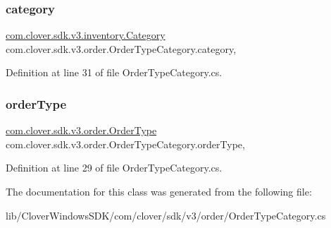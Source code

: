 \subsubsection{\texorpdfstring{category}{category}}
{\footnotesize\ttfamily \hyperlink{classcom_1_1clover_1_1sdk_1_1v3_1_1inventory_1_1_category}{com.\+clover.\+sdk.\+v3.\+inventory.\+Category} com.\+clover.\+sdk.\+v3.\+order.\+Order\+Type\+Category.\+category\hspace{0.3cm}{\ttfamily [get]}, {\ttfamily [set]}}



Definition at line 31 of file Order\+Type\+Category.\+cs.

\mbox{\label{classcom_1_1clover_1_1sdk_1_1v3_1_1order_1_1_order_type_category_a70c6c9677782416203ee5eba23ecd029}} 
\subsubsection{\texorpdfstring{order\+Type}{orderType}}
{\footnotesize\ttfamily \hyperlink{classcom_1_1clover_1_1sdk_1_1v3_1_1order_1_1_order_type}{com.\+clover.\+sdk.\+v3.\+order.\+Order\+Type} com.\+clover.\+sdk.\+v3.\+order.\+Order\+Type\+Category.\+order\+Type\hspace{0.3cm}{\ttfamily [get]}, {\ttfamily [set]}}



Definition at line 29 of file Order\+Type\+Category.\+cs.



The documentation for this class was generated from the following file\+:\begin{DoxyCompactItemize}
\item 
lib/\+Clover\+Windows\+S\+D\+K/com/clover/sdk/v3/order/Order\+Type\+Category.\+cs\end{DoxyCompactItemize}
